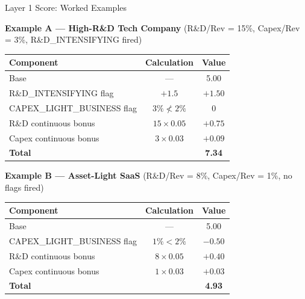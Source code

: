 \documentclass[aspectratio=169]{beamer}
\begin{document}
\begin{frame}{Layer 1 Score: Worked Examples}
\small

\textbf{Example A --- High-R\&D Tech Company}
(R\&D/Rev = 15\%, Capex/Rev = 3\%, R\&D\_INTENSIFYING fired)

\begin{center}
\begin{tabular}{lcc}
\toprule
Component & Calculation & Value \\
\midrule
Base & --- & 5.00 \\
R\&D\_INTENSIFYING flag & $+1.5$ & $+1.50$ \\
CAPEX\_LIGHT\_BUSINESS flag & $3\% \not< 2\%$ & $0$ \\
R\&D continuous bonus & $15 \times 0.05$ & $+0.75$ \\
Capex continuous bonus & $3 \times 0.03$ & $+0.09$ \\
\midrule
\textbf{Total} & & \textbf{7.34} \\
\bottomrule
\end{tabular}
\end{center}

\vspace{0.4cm}
\textbf{Example B --- Asset-Light SaaS}
(R\&D/Rev = 8\%, Capex/Rev = 1\%, no flags fired)

\begin{center}
\begin{tabular}{lcc}
\toprule
Component & Calculation & Value \\
\midrule
Base & --- & 5.00 \\
CAPEX\_LIGHT\_BUSINESS flag & $1\% < 2\%$ & $-0.50$ \\
R\&D continuous bonus & $8 \times 0.05$ & $+0.40$ \\
Capex continuous bonus & $1 \times 0.03$ & $+0.03$ \\
\midrule
\textbf{Total} & & \textbf{4.93} \\
\bottomrule
\end{tabular}
\end{center}

\end{frame}
\end{document}
